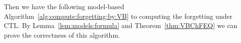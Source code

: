 \documentclass{article}
\begin{document}


Then we have the following model-based Algorithm~\ref{alg:compute:forgetting:by:VB} to computing the forgetting under CTL.
By Lemma~\ref{lem:models:formula} and Theorem~\ref{thm:VBChFEQ} we can prove the correctness of this algorithm.
\end{document}
